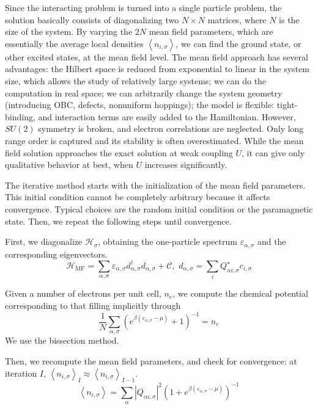 Since the interacting problem is turned into a single particle problem, the solution basically consists of diagonalizing two $N \times N$ matrices, where $N$ is the size of the system.
By varying the $2N$ mean field parameters, which are essentially the average local densities $\left\langle n_{i,\sigma} \right\rangle$, we can find the ground state, or other excited states, at the mean field level.
The mean field approach has several advantages: the Hilbert space is reduced from exponential to linear in the system size, which allows the study of relatively large systems; we can do the computation in real space; we can arbitrarily change the system geometry (introducing OBC, defects, nonuniform hoppings); the model is flexible: tight-binding, and interaction terms are easily added to the Hamiltonian.
However, $SU(2)$ symmetry is broken, and electron correlations are neglected.
Only long range order is captured and its stability is often overestimated.
While the mean field solution approaches the exact solution at weak coupling $U$, it can give only qualitative behavior at best, when $U$ increases significantly.

The iterative method starts with the initialization of the mean field parameters.
This initial condition cannot be completely arbitrary because it affects convergence.
Typical choices are the random initial condition or the paramagnetic state.
Then, we repeat the following steps until convergence.

First, we diagonalize $\mathcal{H}_\sigma$, obtaining the one-particle spectrum $\varepsilon_{\alpha, \sigma}$ and the corresponding eigenvectors.
\begin{equation}
\mathcal{H}_{\text{MF}} = \sum_{\alpha, \sigma} \varepsilon_{\alpha, \sigma} d_{\alpha, \sigma}^\dagger d_{\alpha, \sigma} + \mathcal{C} , \,\, d_{\alpha, \sigma} = \sum_i Q_{\alpha i, \sigma}^\star c_{i,\sigma}
\end{equation}

Given a number of electrons per unit cell, $n_e$, we compute the chemical potential corresponding to that filling implicitly through 
\begin{equation*}
\frac{1}{N} \sum_{\alpha, \sigma} (  e^{\beta ( \varepsilon_{\alpha, \sigma} - \mu ) } +1 )^{-1} = n_e
\end{equation*}
We use the bissection method.

Then, we recompute the mean field parameters, and check for convergence: at iteration $I$, $\left\langle n_{i,\sigma} \right\rangle_I \approx \left\langle n_{i,\sigma} \right\rangle_{I - 1}$.
\begin{equation}\label{eq:selfConsistent}
\left\langle n_{i,\sigma} \right\rangle = \sum_\alpha | Q_{\alpha i, \sigma} |^2 ( 1 + e^ { \beta ( \varepsilon_{\alpha, \sigma} - \mu )} )^{-1}
\end{equation}

